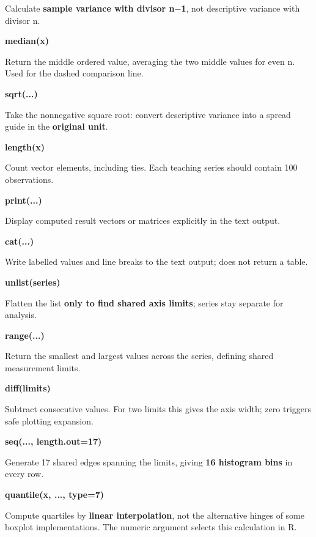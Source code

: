 \documentclass[11pt,a4paper]{article}
\begin{document}
Calculate \textbf{sample variance with divisor n\ensuremath{-}1}, not descriptive variance with divisor n.

\par\noindent\textbf{median(x)}

Return the middle ordered value, averaging the two middle values for even n. Used for the dashed comparison line.

\par\noindent\textbf{sqrt(...)}

Take the nonnegative square root: convert descriptive variance into a spread guide in the \textbf{original unit}.

\par\noindent\textbf{length(x)}

Count vector elements, including ties. Each teaching series should contain 100 observations.

\par\noindent\textbf{print(...)}

Display computed result vectors or matrices explicitly in the text output.

\par\noindent\textbf{cat(...)}

Write labelled values and line breaks to the text output; does not return a table.

\par\noindent\textbf{unlist(series)}

Flatten the list \textbf{only to find shared axis limits}; series stay separate for analysis.

\par\noindent\textbf{range(...)}

Return the smallest and largest values across the series, defining shared measurement limits.

\par\noindent\textbf{diff(limits)}

Subtract consecutive values. For two limits this gives the axis width; zero triggers safe plotting expansion.

\par\noindent\textbf{seq(..., length.out=17)}

Generate 17 shared edges spanning the limits, giving \textbf{16 histogram bins} in every row.

\par\noindent\textbf{quantile(x, ..., type=7)}

Compute quartiles by \textbf{linear interpolation}, not the alternative hinges of some boxplot implementations. The numeric argument selects this calculation in R.
\end{document}
